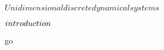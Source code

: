 \unit{ $ Unidimensional discrete dynamical systems $ }
{
	\introduction
	{ 
		$introduction\\$ 
	}

	go

}
